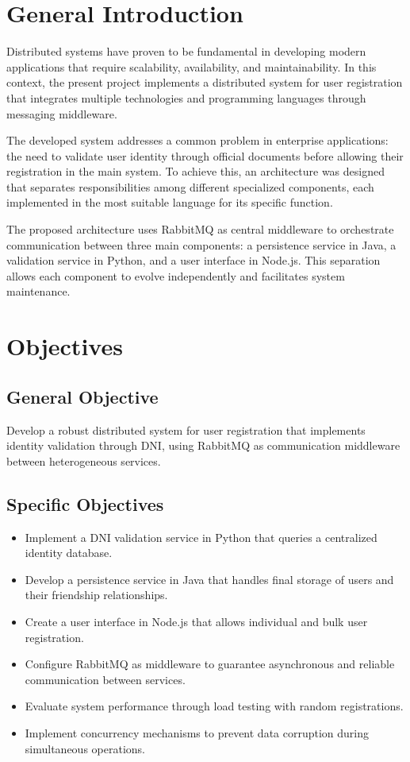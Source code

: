 \documentclass[10pt,a4paper]{article}
\theoremstyle{definition}
\theoremstyle{remark}
\begin{document}
\newpage
\tableofcontents
\newpage

\section{General Introduction}

Distributed systems have proven to be fundamental in developing modern applications that require scalability, availability, and maintainability. In this context, the present project implements a distributed system for user registration that integrates multiple technologies and programming languages through messaging middleware.

The developed system addresses a common problem in enterprise applications: the need to validate user identity through official documents before allowing their registration in the main system. To achieve this, an architecture was designed that separates responsibilities among different specialized components, each implemented in the most suitable language for its specific function.

The proposed architecture uses RabbitMQ as central middleware to orchestrate communication between three main components: a persistence service in Java, a validation service in Python, and a user interface in Node.js. This separation allows each component to evolve independently and facilitates system maintenance.

\section{Objectives}

\subsection{General Objective}
Develop a robust distributed system for user registration that implements identity validation through DNI, using RabbitMQ as communication middleware between heterogeneous services.

\subsection{Specific Objectives}
\begin{itemize}
    \item Implement a DNI validation service in Python that queries a centralized identity database.
    \item Develop a persistence service in Java that handles final storage of users and their friendship relationships.
    \item Create a user interface in Node.js that allows individual and bulk user registration.
    \item Configure RabbitMQ as middleware to guarantee asynchronous and reliable communication between services.
    \item Evaluate system performance through load testing with random registrations.
    \item Implement concurrency mechanisms to prevent data corruption during simultaneous operations.
\end{itemize}
\end{document}
